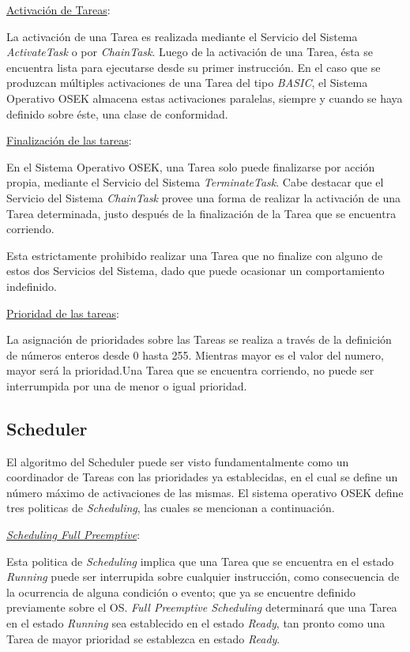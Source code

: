 \documentclass[12pt,letterpaper]{article}
\begin{document}
\underline{Activación de Tareas}: 

La activación de una Tarea es realizada mediante el Servicio del Sistema \textit{ActivateTask} o por \textit{ChainTask}. Luego de la activación de una Tarea, ésta se encuentra lista para ejecutarse desde su primer instrucción. En el caso que se produzcan múltiples activaciones de una Tarea del tipo \textit{BASIC}, el Sistema Operativo OSEK almacena estas activaciones paralelas, siempre y cuando se haya definido sobre éste, una clase de conformidad.

\underline{Finalización de las tareas}:

En el Sistema Operativo OSEK, una Tarea solo puede finalizarse por acción propia, mediante el Servicio del Sistema \textit{TerminateTask}. Cabe destacar que el Servicio del Sistema \textit{ChainTask} provee una forma de realizar la activación de una Tarea determinada, justo después de la finalización de la Tarea que se encuentra corriendo.

Esta estrictamente prohibido realizar una Tarea que no finalize con alguno de estos dos Servicios del Sistema, dado que puede ocasionar un comportamiento indefinido.

\underline{Prioridad de las tareas}:

La asignación de prioridades sobre las Tareas se realiza a través de la definición de números enteros desde 0 hasta 255. Mientras mayor es el valor del numero, mayor será la prioridad.Una Tarea que se encuentra corriendo, no puede ser interrumpida por una de menor o igual prioridad.
\subsection{Scheduler}\label{sec:scheduler}
El algoritmo del Scheduler puede ser visto fundamentalmente como un coordinador de Tareas con las prioridades ya establecidas, en el cual se define un número máximo de activaciones de las mismas. El sistema operativo OSEK define tres politicas de \textit{Scheduling}, las cuales se mencionan a continuación.

\underline{\textit{Scheduling Full Preemptive}}:

Esta politica de \textit{Scheduling} implica que una Tarea que se encuentra en el estado \textit{Running} puede ser interrupida sobre cualquier instrucción, como consecuencia de la ocurrencia de alguna condición o evento; que ya se encuentre definido previamente sobre el OS. \textit{Full Preemptive Scheduling} determinará que una Tarea en el estado \textit{Running} sea establecido en el estado \textit{Ready}, tan pronto como una Tarea de mayor prioridad se establezca en estado \textit{\textit{Ready}}.
\end{document}
